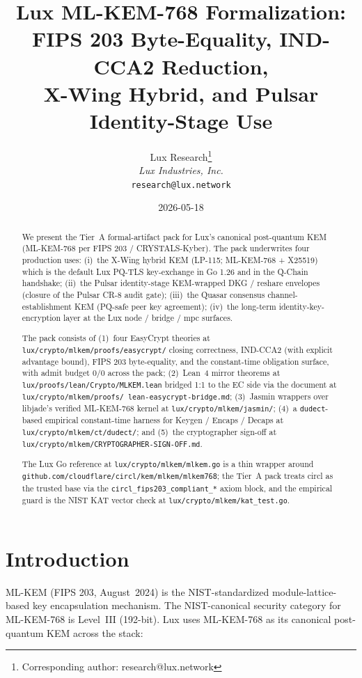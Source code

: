 \documentclass[11pt,a4paper]{article}
\title{\textbf{Lux ML-KEM-768 Formalization:\\FIPS 203 Byte-Equality,
IND-CCA2 Reduction,\\X-Wing Hybrid, and Pulsar Identity-Stage Use}}
\author{
Lux Research\thanks{Corresponding author: research@lux.network}\\
\textit{Lux Industries, Inc.}\\
\texttt{research@lux.network}
}
\date{2026-05-18}
\begin{document}
\maketitle

\begin{abstract}
We present the Tier~A formal-artifact pack for Lux's canonical
post-quantum KEM (ML-KEM-768 per FIPS 203 / CRYSTALS-Kyber). The
pack underwrites four production uses: (i)~the X-Wing hybrid KEM
(LP-115; ML-KEM-768 + X25519) which is the default Lux PQ-TLS
key-exchange in Go 1.26 and in the Q-Chain handshake; (ii)~the
Pulsar identity-stage KEM-wrapped DKG / reshare envelopes
(closure of the Pulsar CR-8 audit gate); (iii)~the Quasar
consensus channel-establishment KEM (PQ-safe peer key agreement);
(iv)~the long-term identity-key-encryption layer at the Lux node /
bridge / mpc surfaces.

The pack consists of (1)~four EasyCrypt theories at
\texttt{lux/crypto/mlkem/proofs/easycrypt/} closing correctness,
IND-CCA2 (with explicit advantage bound), FIPS 203 byte-equality,
and the constant-time obligation surface, with admit budget
$0/0$ across the pack; (2)~Lean~4 mirror theorems at
\texttt{lux/proofs/lean/Crypto/MLKEM.lean} bridged 1:1 to the EC
side via the document at \texttt{lux/crypto/mlkem/proofs/
lean-easycrypt-bridge.md}; (3)~Jasmin wrappers over libjade's
verified ML-KEM-768 kernel at \texttt{lux/crypto/mlkem/jasmin/};
(4)~a \texttt{dudect}-based empirical constant-time harness for
Keygen / Encaps / Decaps at \texttt{lux/crypto/mlkem/ct/dudect/};
and (5)~the cryptographer sign-off at
\texttt{lux/crypto/mlkem/CRYPTOGRAPHER-SIGN-OFF.md}.

The Lux Go reference at \texttt{lux/crypto/mlkem/mlkem.go} is a
thin wrapper around
\texttt{github.com/cloudflare/circl/kem/mlkem/mlkem768}; the
Tier~A pack treats circl as the trusted base via the
\texttt{circl\_fips203\_compliant\_*} axiom block, and the empirical
guard is the NIST KAT vector check at
\texttt{lux/crypto/mlkem/kat\_test.go}.
\end{abstract}

\tableofcontents

\section{Introduction}

ML-KEM (FIPS 203, August~2024) is the NIST-standardized
module-lattice-based key encapsulation mechanism. The
NIST-canonical security category for ML-KEM-768 is Level~III
(192-bit). Lux uses ML-KEM-768 as its canonical post-quantum KEM
across the stack:
\end{document}
